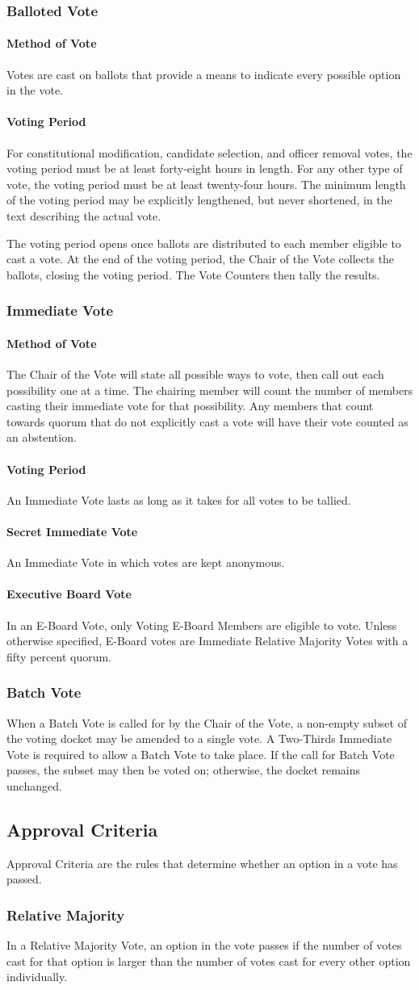 \documentclass{article}
\newcommand{\asection}[1]{\subsection{#1} \label{#1}}
\newcommand{\asubsection}[1]{\subsubsection{#1} \label{#1}}
\newcommand{\asubsubsection}[1]{\paragraph{#1} \label{#1}}
\begin{document}
\asubsection{Balloted Vote}

\asubsubsection{Method of Vote}
Votes are cast on ballots that provide a means to indicate every possible option in the vote.

\asubsubsection{Voting Period}
For constitutional modification, candidate selection, and officer removal votes, the voting period must be at least forty-eight hours in length.
For any other type of vote, the voting period must be at least twenty-four hours.
The minimum length of the voting period may be explicitly lengthened, but never shortened, in the text describing the actual vote.

The voting period opens once ballots are distributed to each member eligible to cast a vote.
At the end of the voting period, the Chair of the Vote collects the ballots, closing the voting period.
The Vote Counters then tally the results.

\asubsection{Immediate Vote}

\asubsubsection{Method of Vote}
The Chair of the Vote will state all possible ways to vote, then call out each possibility one at a time.
The chairing member will count the number of members casting their immediate vote for that possibility.
Any members that count towards quorum that do not explicitly cast a vote will have their vote counted as an abstention.

\asubsubsection{Voting Period}
An Immediate Vote lasts as long as it takes for all votes to be tallied.

\asubsubsection{Secret Immediate Vote}
An Immediate Vote in which votes are kept anonymous.

\asubsubsection{Executive Board Vote}
In an E-Board Vote, only Voting E-Board Members are eligible to vote.
Unless otherwise specified, E-Board votes are Immediate Relative Majority Votes with a fifty percent quorum.

\asubsection{Batch Vote}
When a Batch Vote is called for by the Chair of the Vote, a non-empty subset of the voting docket may be amended to a single vote.
A Two-Thirds Immediate Vote is required to allow a Batch Vote to take place.
If the call for Batch Vote passes, the subset may then be voted on; otherwise, the docket remains unchanged.

\asection{Approval Criteria}
Approval Criteria are the rules that determine whether an option in a vote has passed.

\asubsection{Relative Majority}
In a Relative Majority Vote, an option in the vote passes if the number of votes cast for that option is larger than the number of votes cast for every other option individually.
\end{document}
